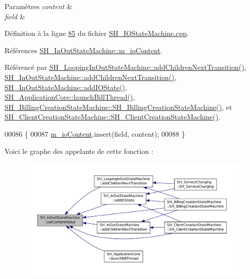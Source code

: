 \begin{DoxyParams}{Paramètres}
{\em content} & \\
\hline
{\em field} & \\
\hline
\end{DoxyParams}


Définition à la ligne \hyperlink{SH__IOStateMachine_8cpp_source_l00085}{85} du fichier \hyperlink{SH__IOStateMachine_8cpp_source}{S\-H\-\_\-\-I\-O\-State\-Machine.\-cpp}.



Références \hyperlink{classSH__InOutStateMachine_a8cfbc27eef057bf37b7711bdfef2077e}{S\-H\-\_\-\-In\-Out\-State\-Machine\-::m\-\_\-io\-Content}.



Référencé par \hyperlink{classSH__LoopingInOutStateMachine_abfae9f47019379f270496de46845c729}{S\-H\-\_\-\-Looping\-In\-Out\-State\-Machine\-::add\-Children\-Next\-Transition()}, \hyperlink{classSH__InOutStateMachine_aa78420f8778d7777809aad77eb8473b4}{S\-H\-\_\-\-In\-Out\-State\-Machine\-::add\-Children\-Next\-Transition()}, \hyperlink{classSH__InOutStateMachine_a2528cffddbe6f98c32ebef41423c0118}{S\-H\-\_\-\-In\-Out\-State\-Machine\-::add\-I\-O\-State()}, \hyperlink{classSH__ApplicationCore_ab72fd6cdc47575d47157fc7bdffae8f2}{S\-H\-\_\-\-Application\-Core\-::launch\-Bill\-Thread()}, \hyperlink{classSH__BillingCreationStateMachine_ad62b77fa4aeafe200056ff3974562f83}{S\-H\-\_\-\-Billing\-Creation\-State\-Machine\-::\-S\-H\-\_\-\-Billing\-Creation\-State\-Machine()}, et \hyperlink{classSH__ClientCreationStateMachine_a0b406b0f404c0fd33bf35be8ce0cc811}{S\-H\-\_\-\-Client\-Creation\-State\-Machine\-::\-S\-H\-\_\-\-Client\-Creation\-State\-Machine()}.


\begin{DoxyCode}
00086 \{
00087     \hyperlink{classSH__InOutStateMachine_a8cfbc27eef057bf37b7711bdfef2077e}{m\_ioContent}.insert(field, content);
00088 \}
\end{DoxyCode}


Voici le graphe des appelants de cette fonction \-:\nopagebreak
\begin{figure}[H]
\begin{center}
\leavevmode
\includegraphics[width=350pt]{classSH__InOutStateMachine_a9ab1534306b2bdb62743d4bcefe40c17_icgraph}
\end{center}
\end{figure}


